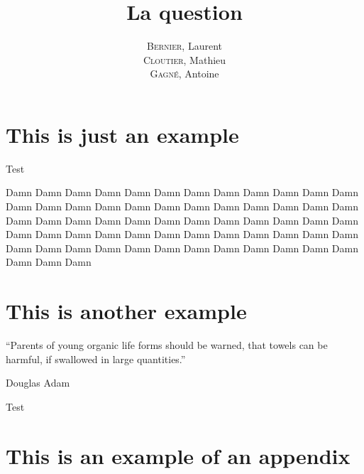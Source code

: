 \documentclass[12pt]{GDD}
\author{%
    \textsc{Bernier}, Laurent \\%
    \textsc{Cloutier}, Mathieu \\%
    \textsc{Gagné}, Antoine%
}
\title{La question}
\begin{document}
\chapter{This is just an example}
\lipsum%
Test

\begin{quoting}
    Damn Damn Damn Damn Damn Damn Damn Damn Damn Damn Damn Damn Damn Damn Damn Damn Damn Damn Damn Damn Damn Damn Damn Damn Damn Damn Damn Damn Damn Damn Damn Damn Damn Damn Damn Damn Damn Damn Damn Damn Damn Damn Damn Damn Damn Damn Damn Damn Damn Damn Damn Damn Damn Damn Damn Damn Damn Damn Damn Damn Damn Damn Damn
\end{quoting}


\chapter{This is another example}
\epigraph{``Parents of young organic life forms should be warned, that towels can be harmful, if swallowed in large quantities.''}{Douglas Adam}
\lipsum%
Test

\printbibliography[heading=bibintoc]%

\appendix

\chapter{This is an example of an appendix}
\lipsum%
\end{document}
